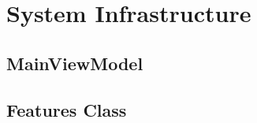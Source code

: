 \section{System Infrastructure} \label{sc:system_infrastructure}

\subsection{MainViewModel} \label{ssc:main_view_model}






\subsection{Features Class} \label{ssc:features}






